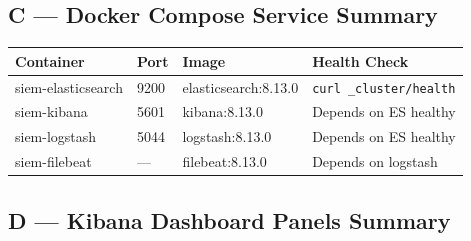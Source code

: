 \documentclass[12pt,a4paper]{article}
\begin{document}
\subsection{C — Docker Compose Service Summary}

\begin{center}
\begin{tabular}{p{3.5cm}p{2cm}p{3cm}p{4.5cm}}
  \toprule
  \textbf{Container} & \textbf{Port} & \textbf{Image} & \textbf{Health Check} \\
  \midrule
  siem-elasticsearch & 9200  & elasticsearch:8.13.0 & \texttt{curl \_cluster/health} \\
  siem-kibana        & 5601  & kibana:8.13.0        & Depends on ES healthy \\
  siem-logstash      & 5044  & logstash:8.13.0      & Depends on ES healthy \\
  siem-filebeat      & —     & filebeat:8.13.0      & Depends on logstash \\
  \bottomrule
\end{tabular}
\end{center}

\subsection{D — Kibana Dashboard Panels Summary}
\end{document}
